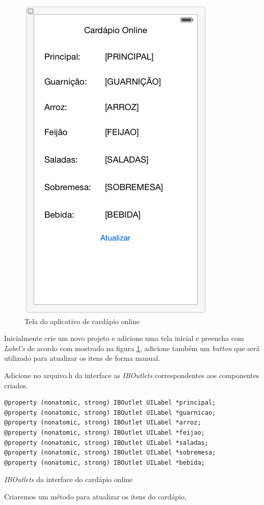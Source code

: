 \documentclass[a4paper,12pt,brazil,oneside]{book}
\begin{document}
\begin{figure}[H]
  \centering
  \includegraphics[width=.45\textwidth]{figuras/5/APP_Cardapio1.png}
  \caption{Tela do aplicativo de cardápio online}
  \label{fig:app_cardapio1}
\end{figure}

Inicialmente crie um novo projeto e adicione uma tela inicial e preencha com \emph{Label's} de acordo com mostrado na figura \ref{fig:app_cardapio1}, adicione também um \emph{button} que será utilizado para atualizar os itens de forma manual.

Adicione no arquivo.h da interface as \emph{IBOutlets} correspondentes aos componentes criados.

\begin{listing}[H]
\begin{verbatim}
@property (nonatomic, strong) IBOutlet UILabel *principal;
@property (nonatomic, strong) IBOutlet UILabel *guarnicao;
@property (nonatomic, strong) IBOutlet UILabel *arroz;
@property (nonatomic, strong) IBOutlet UILabel *feijao;
@property (nonatomic, strong) IBOutlet UILabel *saladas;
@property (nonatomic, strong) IBOutlet UILabel *sobremesa;
@property (nonatomic, strong) IBOutlet UILabel *bebida;
\end{verbatim}
\caption{\emph{IBOutlets} da interface do cardápio online}
\end{listing}

Criaremos um método para atualizar os itens do cardápio,
\end{document}
